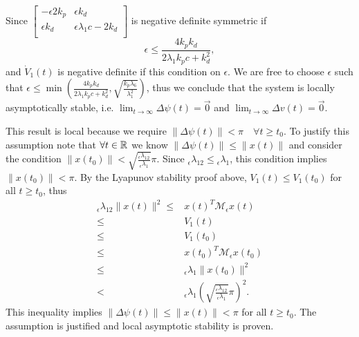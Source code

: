 Since
%
$ \left[\begin{array}{cc}
  -\epsilon 2 k_p  & \epsilon k_d    \\
 \epsilon k_d      &   \epsilon \lambda_1 c- 2k_d\\
  \end{array} \right]$ 
%
is negative definite symmetric if
%
\begin{equation}
\epsilon \leq \frac{4 k_p k_d}{2 \lambda_1 k_p c +k_d^2},
\end{equation}
%
and $\dot{V}_1(t)$ is negative definite if this condition on
$\epsilon$.
%
We are free to choose $\epsilon$ such that
$\epsilon\leq\min\left(\frac{4 k_p k_d}{2 \lambda_1 k_p c
    +k_d^2},\sqrt{\frac{k_p \lambda_6}{\lambda_1^{2}}} \right)$, thus
we conclude that the system is locally asymptotically stable, i.e.
$\lim_{t\to \infty}\Delta \psi(t)=\vec{0}$ and $\lim_{t\to
  \infty}\Delta v(t)=\vec{0}$.



This result is local because we require $\|\Delta\psi(t)\|<\pi\quad \forall t \geq t_0$. To justify this assumption note that
$\forall t\in\mathbb{R}^{}$ we know $\|\Delta\psi(t)\|\leq\|x(t)\|$ and
consider the condition $\|x(t_0)\|<\sqrt{ \frac{
    {_\epsilon}\lambda_{12} } { {_\epsilon}\lambda_1 } } \pi$.
%
Since ${_\epsilon}\lambda_{12}\leq{_\epsilon}\lambda_1$, this
condition implies $\|x(t_0)\|< \pi$.  By the Lyapunov stability proof
above, $V_1(t)\leq V_1(t_0)$ for all $t\geq t_0$, thus
%
\begin{align}
{_\epsilon}\lambda_{12}\|x(t)\|^2
    \leq&x(t)^T \mathcal{M}_\epsilon x(t)
\nonumber \\
    \leq&V_1(t)
\nonumber \\
    \leq&V_1(t_0)
\nonumber \\
    \leq&x(t_0)^T \mathcal{M}_\epsilon x(t_0)
\nonumber \\  
    \leq&{_\epsilon}\lambda_1\|x(t_0)\|^2
\nonumber \\
     <&{_\epsilon}\lambda_1\left(\sqrt{ \frac{ {_\epsilon}\lambda_{12} } {
    {_\epsilon}\lambda_1 } } \pi  \right)^2.    
\end{align}
%
\noindent This inequality implies $\|\Delta \psi(t)\|\leq\|x(t)\|<\pi$
for all $t \geq t_0$.  The assumption is justified and local asymptotic
stability is proven.


